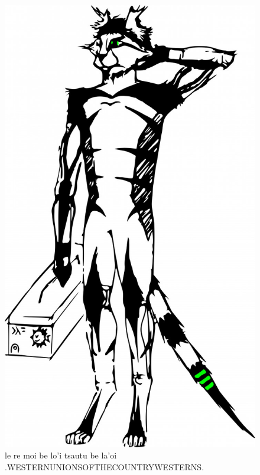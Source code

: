 \documentclass{report}
\begin{document}
\begin{figure}[ht]
	\centering
	\includegraphics[keepaspectratio, width=\textwidth, height=0.75\textheight]{50x/toolbox/s1v2.jpg}
	\caption[center]{le re moi be lo'i tsautu be la'oi .WESTERNUNIONSOFTHECOUNTRYWESTERNS.}
\end{figure}
\end{document}
